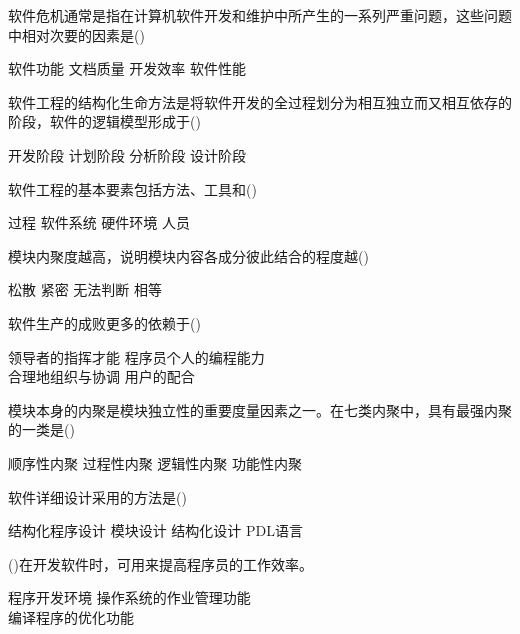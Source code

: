 \documentclass{exam}
\begin{document}
\begin{questions}
	\question 软件危机通常是指在计算机软件开发和维护中所产生的一系列严重问题，这些问题中相对次要的因素是()\\
	\begin{oneparchoices}
		\choice 软件功能
		\choice 文档质量
		\choice 开发效率
		\correctchoice 软件性能
	\end{oneparchoices}
	\question 软件工程的结构化生命方法是将软件开发的全过程划分为相互独立而又相互依存的阶段，软件的逻辑模型形成于()\\
	\begin{oneparchoices}
		\choice 开发阶段
		\choice 计划阶段
		\correctchoice 分析阶段
		\choice 设计阶段
	\end{oneparchoices}
	\question 软件工程的基本要素包括方法、工具和()\\
	\begin{oneparchoices}
		\correctchoice 过程
		\choice 软件系统
		\choice 硬件环境
		\choice 人员
	\end{oneparchoices}
	\question 模块内聚度越高，说明模块内容各成分彼此结合的程度越()\\
	\begin{oneparchoices}
		\choice 松散
		\correctchoice 紧密
		\choice 无法判断
		\choice 相等
	\end{oneparchoices}
	\question 软件生产的成败更多的依赖于()\\
	\begin{oneparchoices}
		\choice 领导者的指挥才能
		\choice 程序员个人的编程能力\\
		\correctchoice 合理地组织与协调
		\choice 用户的配合
	\end{oneparchoices}
	\question 模块本身的内聚是模块独立性的重要度量因素之一。在七类内聚中，具有最强内聚的一类是()\\
	\begin{oneparchoices}
		\choice 顺序性内聚
		\choice 过程性内聚
		\choice 逻辑性内聚
		\correctchoice 功能性内聚
	\end{oneparchoices}
	\question 软件详细设计采用的方法是()\\
	\begin{oneparchoices}
		\choice 结构化程序设计
		\choice 模块设计
		\correctchoice 结构化设计
		\choice PDL语言
	\end{oneparchoices}
	\question ()在开发软件时，可用来提高程序员的工作效率。\\
	\begin{oneparchoices}
		\correctchoice 程序开发环境
		\choice 操作系统的作业管理功能\\
		\choice 编译程序的优化功能

\end{oneparchoices}
\end{questions}
\end{document}
